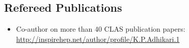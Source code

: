 \documentclass[10pt, letterpaper]{article}
\newcommand{\years}[1]{\marginnote{\small #1}} %
\newcommand{\publication}[2]{
\years{#1} \bibentry{#2}. \par\vspace{0.8mm}
}
\begin{document}
\begin{itemize}

\end{itemize}






\subsection*{Refereed Publications}
\noindent
\begin{itemize}
\item Co-author on more than 40 CLAS publication papers: \\
\url{http://inspirehep.net/author/profile/K.P.Adhikari.1}%
\end{itemize}
\end{document}
